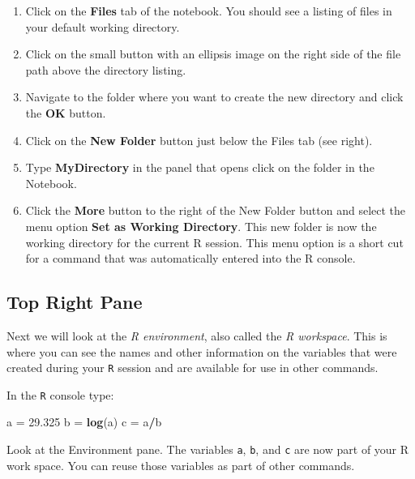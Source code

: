 \documentclass[
]{book}
\newenvironment{Shaded}{\begin{snugshade}}{\end{snugshade}}
\newcommand{\FloatTok}[1]{\textcolor[rgb]{0.00,0.00,0.81}{#1}}
\newcommand{\KeywordTok}[1]{\textcolor[rgb]{0.13,0.29,0.53}{\textbf{#1}}}
\newcommand{\NormalTok}[1]{#1}
\newcommand{\OperatorTok}[1]{\textcolor[rgb]{0.81,0.36,0.00}{\textbf{#1}}}
\newcommand{\StringTok}[1]{\textcolor[rgb]{0.31,0.60,0.02}{#1}}
\begin{document}
\begin{enumerate}
\def\labelenumi{\arabic{enumi})}
\item
  Click on the \textbf{Files} tab of the notebook. You should see a listing of files in your default working directory.
\item
  Click on the small button with an ellipsis image on the right side of the file path above the directory listing.
\item
  Navigate to the folder where you want to create the new directory and click the \textbf{OK} button.
\item
  Click on the \textbf{New Folder} button just below the Files tab (see right).
\item
  Type \textbf{MyDirectory} in the panel that opens click on the folder in the Notebook.
\item
  Click the \textbf{More} button to the right of the New Folder button and select the menu option \textbf{Set as Working Directory}. This new folder is now the working directory for the current R session. This menu option is a short cut for a command that was automatically entered into the R console.
\end{enumerate}

\hypertarget{top-right-pane}{%
\subsection*{Top Right Pane}\label{top-right-pane}}

Next we will look at the \emph{R environment}, also called the \emph{R workspace}. This is where you can see the names and other information on the variables that were created during your \texttt{R} session and are available for use in other commands.

In the \texttt{R} console type:

\begin{Shaded}
\begin{Highlighting}[]
\NormalTok{a =}\StringTok{ }\FloatTok{29.325}
\NormalTok{b =}\StringTok{ }\KeywordTok{log}\NormalTok{(a)}
\NormalTok{c =}\StringTok{ }\NormalTok{a}\OperatorTok{/}\NormalTok{b}
\end{Highlighting}
\end{Shaded}

Look at the Environment pane. The variables \texttt{a}, \texttt{b}, and \texttt{c} are now part of your R work space. You can reuse those variables as part of other commands.
\end{document}
